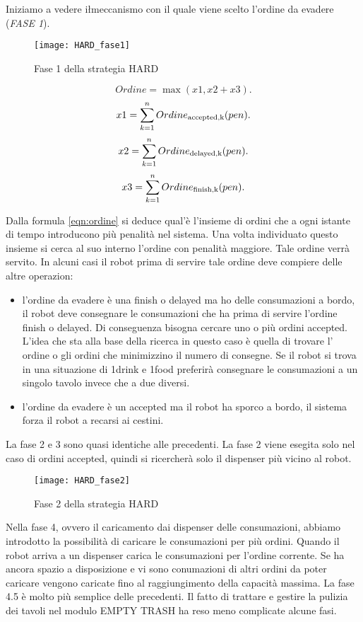 Iniziamo a vedere i\l meccanismo con il quale viene scelto l'ordine da evadere (\emph{FASE 1}).

\begin{figure}[htp]
  \texttt{[image: HARD\_fase1]}
  \caption{Fase 1 della strategia HARD}
  \label{fig:figure7}
\end{figure}

\begin{equation}
\label{eqn:ordine}
Ordine=\max(x1,x2+x3).
\end{equation}
\[
x1=\sum_{k=1}^n Ordine_\textup{accepted,k}(pen).
\]\[
x2=\sum_{k=1}^n Ordine_\textup{delayed,k}(pen).
\]\[
x3=\sum_{k=1}^n Ordine_\textup{finish,k}(pen).
\]

Dalla formula \eqref{eqn:ordine} si deduce qual'è l'insieme di ordini che a ogni istante di tempo introducono più penalità nel sistema. Una volta individuato questo insieme si cerca al suo interno l'ordine con penalità maggiore. Tale ordine verrà servito.
In alcuni casi il robot prima di servire tale ordine deve compiere delle altre operazion:
\begin{itemize}
  \item l'ordine da evadere è una finish o delayed ma ho delle consumazioni a bordo, il robot deve consegnare le consumazioni che ha prima di servire l'ordine finish o delayed. Di conseguenza bisogna cercare uno o più ordini accepted. L'idea che sta alla base della ricerca in questo caso è quella di trovare l' ordine o gli ordini che minimizzino il numero di consegne. Se il robot si trova in una situazione di 1drink e 1food preferirà consegnare le consumazioni a un singolo tavolo invece che a due diversi.
  \item l'ordine da evadere è un accepted ma il robot ha sporco a bordo, il sistema forza il robot a recarsi ai cestini.
\end{itemize}

La fase 2 e 3 sono quasi identiche alle precedenti. La fase 2 viene esegita solo nel caso di ordini accepted, quindi si ricercherà solo il dispenser più vicino al robot.

\begin{figure}[htp]
  \texttt{[image: HARD\_fase2]}
  \caption{Fase 2 della strategia HARD}
  \label{fig:figure8}
\end{figure}

Nella fase 4, ovvero il caricamento dai dispenser delle consumazioni, abbiamo introdotto la possibilità di caricare le consumazioni per più ordini. Quando il robot arriva a un dispenser carica le consumazioni per l'ordine corrente. Se ha ancora spazio a disposizione e vi sono conumazioni di altri ordini da poter caricare vengono caricate fino al raggiungimento della capacità massima.
La fase 4.5 è molto più semplice delle precedenti. Il fatto di trattare e gestire la pulizia dei tavoli nel modulo EMPTY TRASH ha reso meno complicate alcune fasi.

